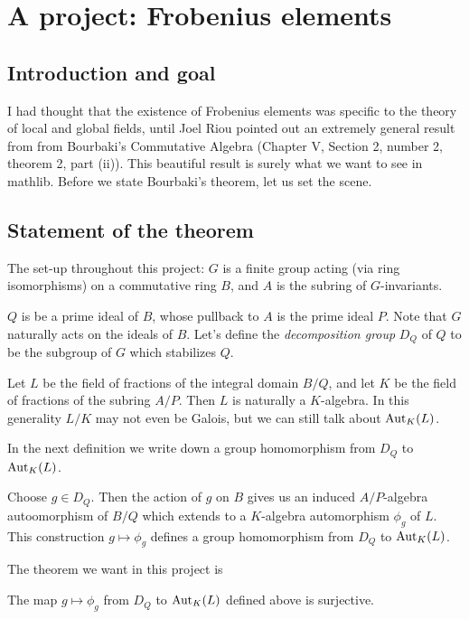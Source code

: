 \chapter{A project: Frobenius elements}

\section{Introduction and goal}

I had thought that the existence of Frobenius elements was specific to the theory
of local and global fields, until Joel Riou pointed out
an extremely general result from from Bourbaki's Commutative Algebra
(Chapter V, Section 2, number 2, theorem 2, part (ii)). This beautiful
result is surely what we want to see in mathlib. Before we state Bourbaki's
theorem, let us set the scene.

\section{Statement of the theorem}

The set-up throughout this project:
$G$ is a finite group acting (via ring isomorphisms) on a commutative ring $B$,
and $A$ is the subring of $G$-invariants.

$Q$ is be a prime ideal of $B$, whose pullback to $A$ is the prime ideal $P$.
Note that $G$ naturally acts on the ideals of $B$. Let's define the
\emph{decomposition group} $D_Q$ of $Q$ to be the subgroup of $G$ which
stabilizes $Q$.

Let $L$ be the field of fractions of the integral domain $B/Q$, and let $K$ be the
field of fractions of the subring $A/P$. Then $L$ is naturally a $K$-algebra.
In this generality $L/K$ may not even be Galois, but we can still talk about
$\operatorname{Aut}_K(L)$.

In the next definition we write down a group homomorphism from $D_Q$ to $\operatorname{Aut}_K(L)$.

\begin{definition}
  \label{Pointwise.stabilizer.toGaloisGroup}
  Choose $g\in D_Q$. Then the action of $g$ on $B$ gives us an induced
  $A/P$-algebra autoomorphism of $B/Q$ which extends to a $K$-algebra automorphism $\phi_g$ of $L$.
  This construction $g\mapsto \phi_g$ defines a group homomorphism from $D_Q$
  to $\operatorname{Aut}_K(L)$.
  \leanok
\end{definition}

The theorem we want in this project is
\begin{theorem}
  \label{MulAction.stabilizer_surjective_of_action}
  The map $g\mapsto \phi_g$ from $D_Q$ to $\operatorname{Aut}_K(L)$ defined above is surjective.
\end{theorem}

